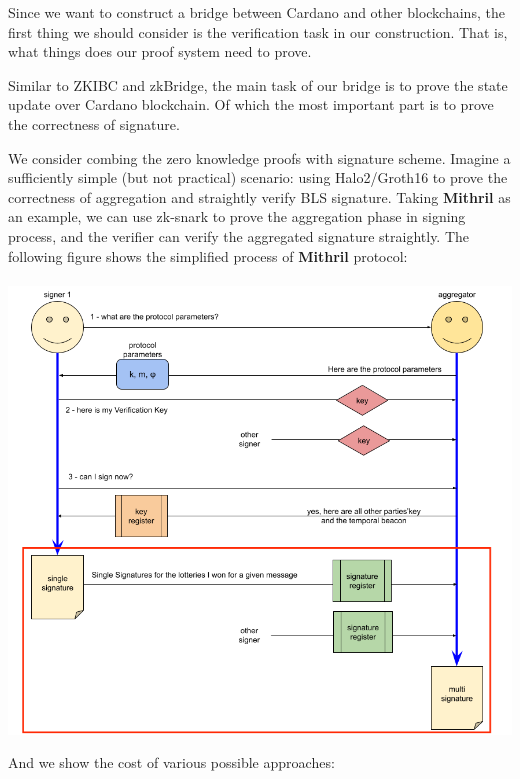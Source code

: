 \documentclass{article}
\begin{document}
Since we want to construct a bridge between Cardano and other blockchains, the first thing we should consider is the verification task in our construction. That is, what things does our proof system need to prove.

Similar to ZKIBC and zkBridge, the main task of our bridge is to prove the state update over Cardano blockchain. Of which the most important part is to prove the correctness of signature. 




We consider combing the zero knowledge proofs with signature scheme. 
Imagine a sufficiently simple (but not practical) scenario: using Halo2/Groth16 to prove the correctness of aggregation and straightly verify BLS signature. Taking \textbf{Mithril} as an example, we can use zk-snark to prove the aggregation phase in signing process, and the verifier can verify the aggregated signature straightly. The following figure shows the simplified process of \textbf{Mithril} protocol:
\\
\\



\includegraphics[width=1\linewidth]{signer-workflow-0099dc5e6cbaa76fca1cf084b510003e.png}





And we show the cost of various possible approaches:
\end{document}
